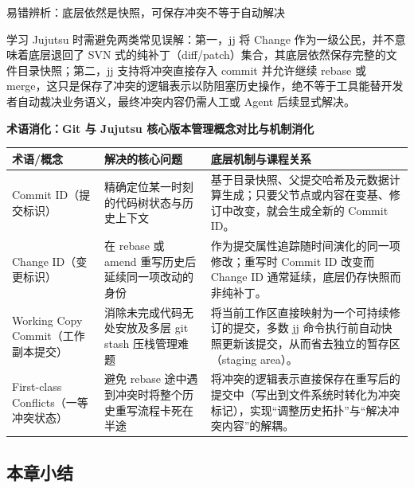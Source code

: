 \documentclass[UTF8,a4paper,11pt,fontset=fandol]{ctexart}
\begin{document}
\begin{warningbox}{易错辨析：底层依然是快照，可保存冲突不等于自动解决}

学习 Jujutsu 时需避免两类常见误解：第一，jj 将 Change 作为一级公民，并不意味着底层退回了 SVN 式的纯补丁（diff/patch）集合，其底层依然保存完整的文件目录快照；第二，jj 支持将冲突直接存入 commit 并允许继续 rebase 或 merge，这只是保存了冲突的逻辑表示以防阻塞历史操作，绝不等于工具能替开发者自动裁决业务语义，最终冲突内容仍需人工或 Agent 后续显式解决。

\end{warningbox}

\par{}\textbf{术语消化：Git 与 Jujutsu 核心版本管理概念对比与机制消化}

\begin{center}\small\begin{tabularx}{\linewidth}{YYY}

\toprule

术语/概念 & 解决的核心问题 & 底层机制与课程关系\\\midrule

Commit ID（提交标识） & 精确定位某一时刻的代码树状态与历史上下文 & 基于目录快照、父提交哈希及元数据计算生成；只要父节点或内容在变基、修订中改变，就会生成全新的 Commit ID。\\[3pt]

Change ID（变更标识） & 在 rebase 或 amend 重写历史后延续同一项改动的身份 & 作为提交属性追踪随时间演化的同一项修改；重写时 Commit ID 改变而 Change ID 通常延续，底层仍存快照而非纯补丁。\\[3pt]

Working Copy Commit（工作副本提交） & 消除未完成代码无处安放及多层 git stash 压栈管理难题 & 将当前工作区直接映射为一个可持续修订的提交，多数 jj 命令执行前自动快照更新该提交，从而省去独立的暂存区（staging area）。\\[3pt]

First-class Conflicts（一等冲突状态） & 避免 rebase 途中遇到冲突时将整个历史重写流程卡死在半途 & 将冲突的逻辑表示直接保存在重写后的提交中（写出到文件系统时转化为冲突标记），实现“调整历史拓扑”与“解决冲突内容”的解耦。\\[3pt]

\bottomrule\end{tabularx}\end{center}

\subsection{本章小结}
\end{document}
